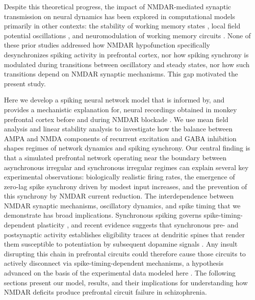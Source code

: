 \documentclass[10pt]{article}
\begin{document}
Despite this theoretical progress, the impact of NMDAR-mediated synaptic transmission on neural dynamics has been explored in computational models primarily in other contexts: the stability of working memory states \citep{wang1999synaptic, compte2000synaptic}, local field potential oscillations \citep{brunel2003fast}, and neuromodulation of working memory circuits \citep{brunel2001effects}. None of these prior studies addressed how NMDAR hypofunction specifically desynchronizes spiking activity in prefrontal cortex, nor how spiking synchrony is modulated during transitions between oscillatory and steady states, nor how such transitions depend on NMDAR synaptic mechanisms. This gap motivated the present study.

Here we develop a spiking neural network model that is informed by, and provides a mechanistic explanation for, neural recordings obtained in monkey prefrontal cortex before and during NMDAR blockade \citep{zick2018blocking}. We use mean field analysis and linear stability analysis to investigate how the balance between AMPA and NMDA components of recurrent excitation and GABA inhibition shapes regimes of network dynamics and spiking synchrony. Our central finding is that a simulated prefrontal network operating near the boundary between asynchronous irregular and synchronous irregular regimes can explain several key experimental observations: biologically realistic firing rates, the emergence of zero-lag spike synchrony driven by modest input increases, and the prevention of this synchrony by NMDAR current reduction. The interdependence between NMDAR synaptic mechanisms, oscillatory dynamics, and spike timing that we demonstrate has broad implications. Synchronous spiking governs spike-timing-dependent plasticity \citep{dan2004spike}, and recent evidence suggests that synchronous pre- and postsynaptic activity establishes eligibility traces at dendritic spines that render them susceptible to potentiation by subsequent dopamine signals \citep{he2015eligibility, yagishita2014critical}. Any insult disrupting this chain in prefrontal circuits could therefore cause those circuits to actively disconnect via spike-timing-dependent mechanisms, a hypothesis advanced on the basis of the experimental data modeled here \citep{zick2018blocking, zick2021disparate}. The following sections present our model, results, and their implications for understanding how NMDAR deficits produce prefrontal circuit failure in schizophrenia.

\end{document}
